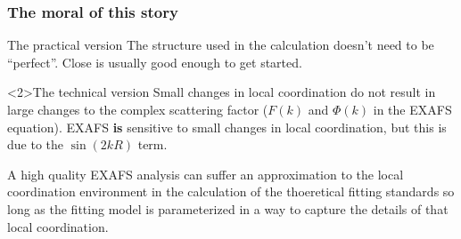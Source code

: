 \documentclass[10pt, xcolor=x11names, compress]{beamer}
\begin{document}
\begin{frame}
  \frametitle{The moral of this story}
  \begin{block}{The practical version}
    The structure used in the {\feff} calculation doesn't need to be
    ``perfect''.  Close is usually good enough to get started.
  \end{block}

  \medskip

  \begin{alertblock}<2>{The technical version}
    Small changes in local coordination do not result in large changes
    to the complex scattering factor ($F(k)$ and $\Phi(k)$ in the
    EXAFS equation).  EXAFS \alert{\textbf{is}} sensitive to small
    changes in local coordination, but this is due to the $\sin(2kR)$
    term.

    \smallskip

    A high quality EXAFS analysis can suffer an approximation to the
    local coordination environment in the calculation of the
    thoeretical fitting standards so long as the fitting model is
    parameterized in a way to capture the details of that local
    coordination.
  \end{alertblock}
\end{frame}
\end{document}
